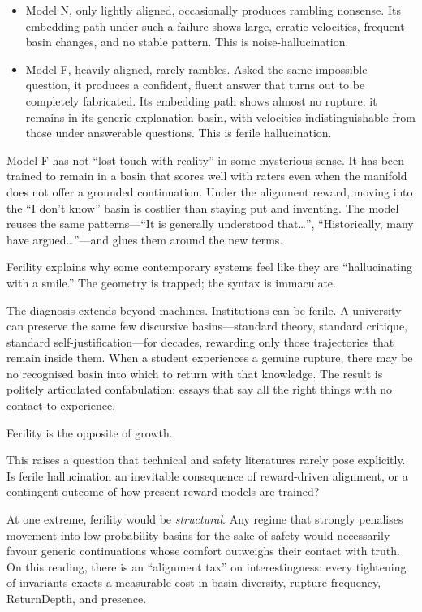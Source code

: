 \documentclass[12pt,a4paper]{article}
\begin{document}
\begin{itemize}
  \item Model N, only lightly aligned, occasionally produces rambling nonsense. Its embedding path under such a failure shows large, erratic velocities, frequent basin changes, and no stable pattern. This is noise-hallucination.

  \item Model F, heavily aligned, rarely rambles. Asked the same impossible question, it produces a confident, fluent answer that turns out to be completely fabricated. Its embedding path shows almost no rupture: it remains in its generic-explanation basin, with velocities indistinguishable from those under answerable questions. This is ferile hallucination.
\end{itemize}

Model F has not ``lost touch with reality'' in some mysterious sense. It has been trained to remain in a basin that scores well with raters even when the manifold does not offer a grounded continuation. Under the alignment reward, moving into the ``I don't know'' basin is costlier than staying put and inventing. The model reuses the same patterns---``It is generally understood that\ldots'', ``Historically, many have argued\ldots''---and glues them around the new terms.

Ferility explains why some contemporary systems feel like they are ``hallucinating with a smile.'' The geometry is trapped; the syntax is immaculate.

The diagnosis extends beyond machines. Institutions can be ferile. A university can preserve the same few discursive basins---standard theory, standard critique, standard self-justification---for decades, rewarding only those trajectories that remain inside them. When a student experiences a genuine rupture, there may be no recognised basin into which to return with that knowledge. The result is politely articulated confabulation: essays that say all the right things with no contact to experience.

Ferility is the opposite of growth.

This raises a question that technical and safety literatures rarely pose explicitly. Is ferile hallucination an inevitable consequence of reward-driven alignment, or a contingent outcome of how present reward models are trained?

At one extreme, ferility would be \emph{structural}. Any regime that strongly penalises movement into low-probability basins for the sake of safety would necessarily favour generic continuations whose comfort outweighs their contact with truth. On this reading, there is an ``alignment tax'' on interestingness: every tightening of invariants exacts a measurable cost in basin diversity, rupture frequency, ReturnDepth, and presence.
\end{document}
